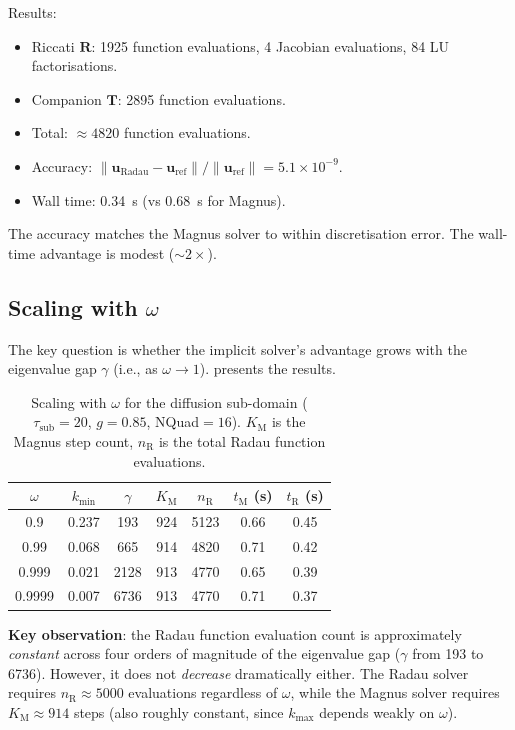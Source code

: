 \documentclass[11pt,a4paper]{article}
\newcommand{\vect}[1]{\bm{#1}}
\newcommand{\mat}[1]{\mathbf{#1}}
\newcommand{\tsub}{\tau_{\mathrm{sub}}}
\newcommand{\kmax}{k_{\max}}
\newcommand{\kmin}{k_{\min}}
\theoremstyle{definition}
\begin{document}
Results:
\begin{itemize}[nosep]
\item Riccati $\mat{R}$: 1925 function evaluations, 4 Jacobian
  evaluations, 84 LU factorisations.
\item Companion $\mat{T}$: 2895 function evaluations.
\item Total: $\approx 4820$ function evaluations.
\item Accuracy: $\|\vect{u}_{\text{Radau}}-\vect{u}_{\text{ref}}\|/\|\vect{u}_{\text{ref}}\| = 5.1\times 10^{-9}$.
\item Wall time: 0.34~s (vs 0.68~s for Magnus).
\end{itemize}

The accuracy matches the Magnus solver to within discretisation error.
The wall-time advantage is modest (${\sim}2\times$).

\subsection{Scaling with $\omega$}\label{sec:omega_scaling}

The key question is whether the implicit solver's advantage grows
with the eigenvalue gap $\gamma$ (i.e., as $\omega\to 1$).
 presents the results.

\begin{table}[h]\centering
\caption{Scaling with $\omega$ for the diffusion sub-domain
($\tsub=20$, $g=0.85$, NQuad${}=16$).  $K_{\text{M}}$ is the Magnus
step count, $n_{\text{R}}$ is the total Radau function evaluations.}
\label{tab:scaling}
\begin{tabular}{ccccccc}
\toprule
$\omega$ & $\kmin$ & $\gamma$ & $K_{\text{M}}$ & $n_{\text{R}}$
& $t_{\text{M}}$ (s) & $t_{\text{R}}$ (s) \\
\midrule
0.9    & 0.237 &   193 & 924  & 5123 & 0.66 & 0.45 \\
0.99   & 0.068 &   665 & 914  & 4820 & 0.71 & 0.42 \\
0.999  & 0.021 &  2128 & 913  & 4770 & 0.65 & 0.39 \\
0.9999 & 0.007 &  6736 & 913  & 4770 & 0.71 & 0.37 \\
\bottomrule
\end{tabular}
\end{table}

\textbf{Key observation}: the Radau function evaluation count is
approximately \emph{constant} across four orders of magnitude of the
eigenvalue gap ($\gamma$ from 193 to 6736).  However, it does not
\emph{decrease} dramatically either.  The Radau solver requires
$n_{\text{R}}\approx 5000$ evaluations regardless of $\omega$,
while the Magnus solver requires $K_{\text{M}}\approx 914$ steps
(also roughly constant, since $\kmax$ depends weakly on $\omega$).
\end{document}
